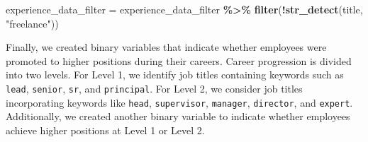 \documentclass[11pt,]{article}
\newenvironment{Shaded}{\begin{snugshade}}{\end{snugshade}}
\newcommand{\FunctionTok}[1]{\textcolor[rgb]{0.13,0.29,0.53}{\textbf{#1}}}
\newcommand{\NormalTok}[1]{#1}
\newcommand{\OtherTok}[1]{\textcolor[rgb]{0.56,0.35,0.01}{#1}}
\newcommand{\SpecialCharTok}[1]{\textcolor[rgb]{0.81,0.36,0.00}{\textbf{#1}}}
\newcommand{\StringTok}[1]{\textcolor[rgb]{0.31,0.60,0.02}{#1}}
\begin{document}
\begin{Shaded}
\begin{Highlighting}[]
\NormalTok{experience\_data\_filter }\OtherTok{=}\NormalTok{ experience\_data\_filter }\SpecialCharTok{\%\textgreater{}\%} 
  \FunctionTok{filter}\NormalTok{(}\SpecialCharTok{!}\FunctionTok{str\_detect}\NormalTok{(title, }\StringTok{"freelance"}\NormalTok{))}
\end{Highlighting}
\end{Shaded}

Finally, we created binary variables that indicate whether employees
were promoted to higher positions during their careers. Career
progression is divided into two levels. For Level 1, we identify job
titles containing keywords such as \texttt{lead}, \texttt{senior},
\texttt{sr}, and \texttt{principal}. For Level 2, we consider job titles
incorporating keywords like \texttt{head}, \texttt{supervisor},
\texttt{manager}, \texttt{director}, and \texttt{expert}. Additionally,
we created another binary variable to indicate whether employees achieve
higher positions at Level 1 or Level 2.
\end{document}
